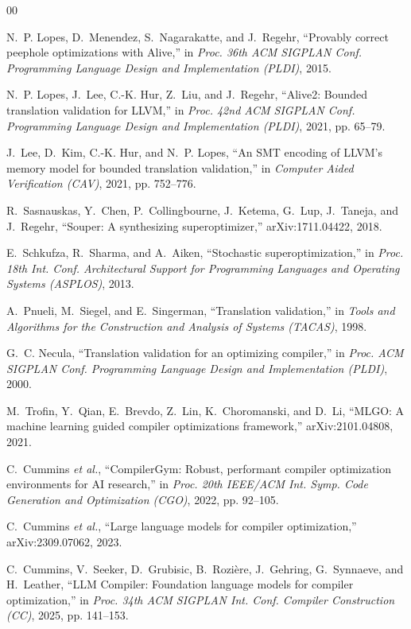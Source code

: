 \documentclass[conference]{IEEEtran}
\begin{document}
\begin{thebibliography}{00}

N.~P. Lopes, D.~Menendez, S.~Nagarakatte, and J.~Regehr, ``Provably correct
peephole optimizations with Alive,'' in \emph{Proc. 36th ACM SIGPLAN Conf.
Programming Language Design and Implementation (PLDI)}, 2015.

N.~P. Lopes, J.~Lee, C.-K. Hur, Z.~Liu, and J.~Regehr, ``Alive2: Bounded
translation validation for LLVM,'' in \emph{Proc. 42nd ACM SIGPLAN Conf.
Programming Language Design and Implementation (PLDI)}, 2021, pp. 65--79.

J.~Lee, D.~Kim, C.-K. Hur, and N.~P. Lopes, ``An SMT encoding of LLVM's memory
model for bounded translation validation,'' in \emph{Computer Aided
Verification (CAV)}, 2021, pp. 752--776.

R.~Sasnauskas, Y.~Chen, P.~Collingbourne, J.~Ketema, G.~Lup, J.~Taneja, and
J.~Regehr, ``Souper: A synthesizing superoptimizer,'' arXiv:1711.04422, 2018.

E.~Schkufza, R.~Sharma, and A.~Aiken, ``Stochastic superoptimization,'' in
\emph{Proc. 18th Int. Conf. Architectural Support for Programming Languages and
Operating Systems (ASPLOS)}, 2013.

A.~Pnueli, M.~Siegel, and E.~Singerman, ``Translation validation,'' in
\emph{Tools and Algorithms for the Construction and Analysis of Systems
(TACAS)}, 1998.

G.~C. Necula, ``Translation validation for an optimizing compiler,'' in
\emph{Proc. ACM SIGPLAN Conf. Programming Language Design and Implementation
(PLDI)}, 2000.

M.~Trofin, Y.~Qian, E.~Brevdo, Z.~Lin, K.~Choromanski, and D.~Li, ``MLGO: A
machine learning guided compiler optimizations framework,'' arXiv:2101.04808,
2021.

C.~Cummins \emph{et al.}, ``CompilerGym: Robust, performant compiler
optimization environments for AI research,'' in \emph{Proc. 20th IEEE/ACM Int.
Symp. Code Generation and Optimization (CGO)}, 2022, pp. 92--105.

C.~Cummins \emph{et al.}, ``Large language models for compiler optimization,''
arXiv:2309.07062, 2023.

C.~Cummins, V.~Seeker, D.~Grubisic, B.~Rozi\`{e}re, J.~Gehring, G.~Synnaeve,
and H.~Leather, ``LLM Compiler: Foundation language models for compiler
optimization,'' in \emph{Proc. 34th ACM SIGPLAN Int. Conf. Compiler
Construction (CC)}, 2025, pp. 141--153.


\end{thebibliography}
\end{document}
